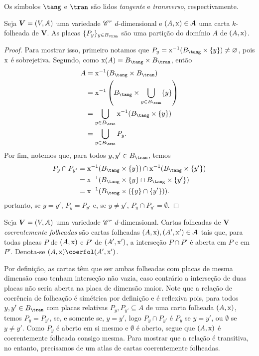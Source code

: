 Os símbolos $\tang$ e $\tran$ são lidos \emph{tangente} e \emph{transverso}, respectivamente.

\begin{prop}
Seja $\bm V = (V,\mathcal{A})$ uma variedade $\mathscr{C}^r$ $d$-dimensional e $(A,\mathrm{x}) \in \mathcal{A}$ uma carta $k$-folheada de $\bm V$. As placas $\{P_y\}_{y \in B_\tran}$ são uma partição do domínio $A$ de $(A,\mathrm{x})$.
\end{prop}
\begin{proof}
Para mostrar isso, primeiro notamos que $P_y = \x\inv(B_\tang \times \{y\}) \neq \emptyset$, pois $\mathrm{x}$ é sobrejetiva. Segundo, como $\x(A) = B_\tang \times B_\tran$, então
	\begin{align*}
	A &= \x\inv(B_\tang \times B_\tran) \\
		&=  \x\inv\left(B_\tang \times \bigcup_{y \in B_\tran}\{y\}\right) \\
		&= \bigcup_{y \in B_\tran} \x\inv(B_\tang \times \{y\}) \\
		&= \bigcup_{y \in B_\tran} P_y.		
	\end{align*}
Por fim, notemos que, para todos $y,y' \in B_\tran$, temos
	\begin{align*}
	P_y \cap P_{y'} &= \x\inv(B_\tang \times \{y\}) \cap \x\inv(B_\tang \times \{y'\}) \\
		&= \x\inv(B_\tang \times \{y\} \cap B_\tang \times \{y'\}) \\
		&= \x\inv(B_\tang \times (\{y\} \cap \{y'\})).
	\end{align*}
portanto, se $y=y'$, $P_y = P_{y'}$ e, se $y \neq y'$, $P_y \cap P_{y'} = \emptyset$.
\end{proof}

\begin{defi}
Seja $\bm V = (V,\mathcal{A})$ uma variedade $\mathscr{C}^r$ $d$-dimensional. Cartas folheadas de $\bm V$ \emph{coerentemente folheadas} são cartas folheadas $(A,\mathrm{x}), (A',\mathrm{x}') \in \mathcal{A}$ tais que, para todas placas $P$ de $(A,\mathrm{x})$ e $P'$ de $(A',\mathrm{x}')$, a interseção $P \cap P'$ é aberta em $P$ e em $P'$. Denota-se $(A,\x) \coerfol (A',\x')$.
\end{defi}

Por definição, as cartas têm que ser ambas folheadas com placas de mesma dimensão caso tenham interseção não vazia, caso contrário a interseção de duas placas não seria aberta na placa de dimensão maior. Note que a relação de coerência de folheação é simétrica por definição e é reflexiva pois, para todos $y,y' \in B_\tran$ com placas relativas $P_y,P_{y'} \subseteq A$ de uma carta folheada $(A,\mathrm{x})$, temos $P_y = P_{y'}$, se, e somente se, $y=y'$, logo $P_y \cap P_{y'}$ é $P_y$ se $y=y'$, ou $\emptyset$ se $y \neq y'$. Como $P_y$ é aberto em si mesmo e $\emptyset$ é aberto, segue que $(A,\mathrm{x})$ é coerentemente folheada consigo mesma. Para mostrar que a relação é transitiva, no entanto, precisamos de um atlas de cartas coerentemente folheadas. 

